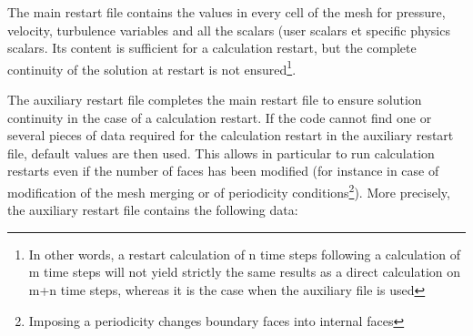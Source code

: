 {{{{The main restart file contains the values in every cell of the mesh for
pressure, velocity, turbulence variables and all the scalars (user scalars et specific physics scalars.
Its content is sufficient for a calculation restart, but the complete continuity of the solution at
restart is not ensured\footnote{In other words, a restart calculation of n time
steps following a calculation of m time steps will not yield strictly the same
results as a direct calculation on m+n time steps, whereas it is the case when
the auxiliary file is used}.

The auxiliary restart file completes the main restart file to ensure
solution continuity in the case of a calculation restart.
If the code cannot find one or several pieces of data required for the
calculation restart in the auxiliary restart file, default values are
then used. This allows in particular to run calculation restarts even if
the number of faces has been modified (for instance in case of
modification of the mesh merging or of periodicity
conditions\footnote{Imposing a periodicity changes boundary faces into
internal faces}). More precisely, the auxiliary restart file contains
the following data:

}}}}
